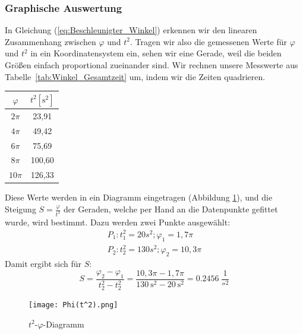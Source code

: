 \documentclass{article}
\begin{document}
	\subsubsection{Graphische Auswertung}
	In Gleichung (\ref{eq:Beschleunigter_Winkel}) erkennen wir den linearen Zusammenhang zwischen \( \varphi \) und \( t^2 \).
	Tragen wir also die gemessenen Werte für \( \varphi \) und \( t^2 \) in ein Koordinatensystem ein, sehen wir eine Gerade, weil die beiden Größen einfach proportional zueinander sind.
	Wir rechnen unsere Messwerte aus Tabelle~\ref{tab:Winkel_Gesamtzeit} um, indem wir die Zeiten quadrieren.
	\begin{center}
		\begin{tabular}{ | c | c | }
			\hline
			\( \varphi \) & \(t^2 [\unit{\second^2}] \) \\
			\hline
			\( 2\pi \)    & 23,91 \\
			\( 4\pi \)    & 49,42 \\
			\( 6\pi \)    & 75,69 \\
			\( 8\pi \)    & 100,60 \\
			\( 10\pi \)   & 126,33 \\
			\hline
		\end{tabular}
	\end{center}
	Diese Werte werden in ein Diagramm eingetragen (Abbildung \ref{fig:Diagramm}), und die Steigung \( S = \frac{\varphi}{t^2} \) der Geraden, welche per Hand an die Datenpunkte gefittet wurde, wird bestimmt. Dazu werden zwei Punkte ausgewählt:
	\begin{equation}
		\begin{gathered}\label{eq:punkte}
			P_1: t^2_1 = 20s^2 ; \varphi_1 = 1,7 \pi \\
			P_2: t^2_2 = 130s^2 ; \varphi_2 = 10,3 \pi
		\end{gathered} %
	\end{equation}
	Damit ergibt sich für \( S \):
	\begin{equation}
		S = \frac{ \varphi_2 - \varphi_1 }{ t^2_2 - t^2_2 } = \frac{ 10,3 \pi - 1,7 \pi }{ \SI{130}{\second^2} - \SI{20}{\second^2} } = \SI{0,2456}{\frac{1}{\second^2}}
	\end{equation}
	\begin{figure}
		\centering
		\texttt{[image: Phi(t^2).png]}
		\caption{\label{fig:Diagramm}$t^2$-$\varphi$-Diagramm}
	\end{figure}
\end{document}
